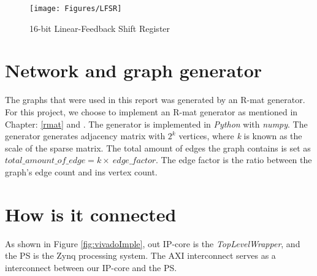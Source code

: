\begin{figure}[!ht]
\texttt{[image: Figures/LFSR]}
\caption{16-bit Linear-Feedback Shift Register}
    \label{fig:LFSR}
\end{figure}


\section{Network and graph generator}
The graphs that were used in this report was generated by an R-mat generator. For this project, we choose to implement an R-mat generator as mentioned in Chapter: \ref{rmat} and  \cite{Rmat2004}. The generator is implemented in \textit{Python} \cite{PYTHON} with \textit{numpy}. The generator generates adjacency matrix with $2^k$ vertices, where \textit{k} is known as the scale of the sparse matrix. The total amount of edges the graph contains is set as $total\_amount\_of\_edge = k \times\ edge\_factor $. The edge factor is the ratio between the graph's edge count and ins vertex count\cite{graph500}.



\section{How is it connected}
As shown in Figure \ref{fig:vivadoImple}, out IP-core is the \textit{TopLevelWrapper}, and the PS is the Zynq processing system. The AXI interconnect serves as a interconnect between our IP-core and the PS.

